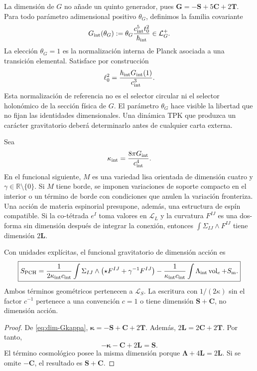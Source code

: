 La dimensión de \(G\) no añade un quinto generador, pues
\(\mathbf G=-\mathbf S+5\mathbf C+2\mathbf T\). Para todo parámetro
adimensional positivo \(\theta_G\), definimos la familia covariante
\begin{equation}
 G_{\rm int}(\theta_G)
 :=\theta_G\frac{c_{\rm int}^{5}t_0^2}{\hbar_{\rm int}}
 \in\mathcal L_G^+.
 \label{eq:G-interno}
\end{equation}
La elección \(\theta_G=1\) es la normalización interna de Planck asociada a
una transición elemental. Satisface por construcción
\[
 \ell_0^2=\frac{\hbar_{\rm int}G_{\rm int}(1)}
 {c_{\rm int}^{3}}.
\]
Esta normalización de referencia no es el selector circular ni el selector
holonómico de la sección física de \(G\).
El parámetro \(\theta_G\) hace visible la libertad que no fijan las
identidades dimensionales. Una dinámica TPK que produzca un carácter
gravitatorio deberá determinarlo antes de cualquier carta externa.

Sea
\[
 \kappa_{\rm int}=\frac{8\pi G_{\rm int}}{c_{\rm int}^{4}}.
\]
En el funcional siguiente, \(M\) es una variedad lisa orientada de
dimensión cuatro y \(\gamma\in\mathbb R\setminus\{0\}\). Si \(M\) tiene
borde, se imponen variaciones de soporte compacto en el interior o un
término de borde con condiciones que anulen la variación fronteriza. Una
acción de materia espinorial presupone, además, una estructura de espín
compatible.
Si la co-tétrada \(e^I\) toma valores en \(\mathcal L_L\) y la curvatura
\(F^{IJ}\) es una dos-forma sin dimensión después de integrar la conexión,
entonces
\(\int\Sigma_{IJ}\wedge F^{IJ}\) tiene dimensión \(2\mathbf L\).

\begin{theorem}
\label{thm:homogeneidad-pch}
Con unidades explícitas, el funcional gravitatorio de dimensión acción es
\[
 \boxed{
 S_{\rm PCH}
 =\frac1{2\kappa_{\rm int}c_{\rm int}}
 \int\Sigma_{IJ}\wedge
 \left(\star F^{IJ}+\gamma^{-1}F^{IJ}\right)
 -\frac1{\kappa_{\rm int}c_{\rm int}}
 \int\Lambda_{\rm int}\operatorname{vol}_e
 +S_{\rm m}.}
 \]
Ambos términos geométricos pertenecen a \(\mathcal L_S\). La escritura con
\(1/(2\kappa)\) sin el factor \(c^{-1}\) pertenece a una convención
\(c=1\) o tiene dimensión \(\mathbf S+\mathbf C\), no dimensión acción.
\end{theorem}

\begin{proof}
De \eqref{eq:dim-Gkappa},
\(\boldsymbol\kappa=-\mathbf S+\mathbf C+2\mathbf T\). Además,
\(2\mathbf L=2\mathbf C+2\mathbf T\). Por tanto,
\[
 -\boldsymbol\kappa-\mathbf C+2\mathbf L
 =\mathbf S.
\]
El término cosmológico posee la misma dimensión porque
\(\boldsymbol\Lambda+4\mathbf L=2\mathbf L\). Si se omite
\(-\mathbf C\), el resultado es \(\mathbf S+\mathbf C\).
\end{proof}

